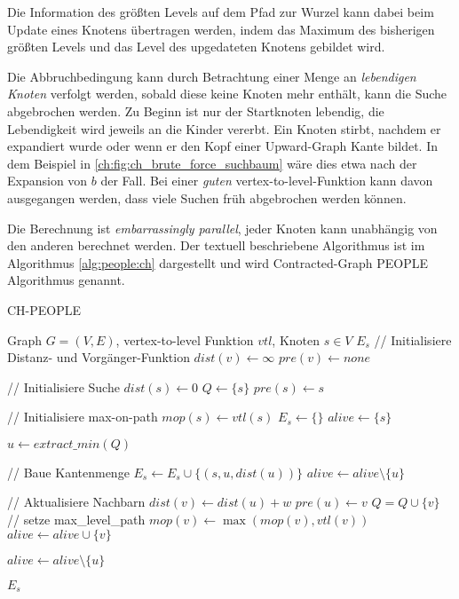 Die Information des größten Levels auf dem Pfad zur Wurzel kann dabei beim Update eines Knotens übertragen werden, indem das Maximum des bisherigen größten Levels und das Level des upgedateten Knotens gebildet wird.


Die Abbruchbedingung kann durch Betrachtung einer Menge an \emph{lebendigen Knoten} verfolgt werden, sobald diese keine Knoten mehr enthält, kann die Suche abgebrochen werden.
Zu Beginn ist nur der Startknoten lebendig, die Lebendigkeit wird jeweils an die Kinder vererbt.
Ein Knoten stirbt, nachdem er expandiert wurde oder wenn er den Kopf einer Upward-Graph Kante bildet.
In dem Beispiel in \autoref{ch:fig:ch_brute_force_suchbaum} wäre dies etwa nach der Expansion von $b$ der Fall.
Bei einer \emph{guten} vertex-to-level-Funktion kann davon ausgegangen werden, dass viele Suchen früh abgebrochen werden können.

Die Berechnung ist \emph{embarrassingly parallel}, jeder Knoten kann unabhängig von den anderen berechnet werden.
Der textuell beschriebene Algorithmus ist im Algorithmus \ref{alg:people:ch} dargestellt und wird Contracted-Graph PEOPLE Algorithmus genannt.

\begin{algorithm}[p]
  \caption{CH-PEOPLE}
  \begin{algorithmic}[1]
    \Require Graph $G = (V, E)$, vertex-to-level Funktion ${vtl}$, Knoten $s \in V$
    \Ensure $E_s$
    \State // Initialisiere Distanz- und Vorgänger-Funktion
    \State ${dist}(v) \leftarrow \infty$
    \State ${pre}(v) \leftarrow {none}$
    \EndFor

    \State
    \State // Initialisiere Suche
    \State ${dist}(s) \leftarrow 0$
    \State $Q\leftarrow \{ s \}$
    \State ${pre}(s) \leftarrow s$

    \State
    \State // Initialisiere max-on-path
    \State ${mop}(s) \leftarrow {vtl}(s)$
    \State $E_s \leftarrow \{ \}$
    \State ${alive} \leftarrow \{ s \}$

    \State
    \State $u \leftarrow{extract\_min}(Q)$\label{graphs:dijkstra:pop}

    \State
    \State // Baue Kantenmenge
    \State $E_s \leftarrow E_s \cup \{ (s, u, {dist}(u)) \}$
    \State ${alive} \leftarrow {alive} \setminus \{ u \}$
    \EndIf

    \State
    \State // Aktualisiere Nachbarn
    \State ${dist}(v) \leftarrow {dist}(u) + w$
    \State ${pre}(u) \leftarrow v$
    \State $Q = Q \cup \{ v \}$
    \State
    \State // setze max\_level\_path
    \State ${mop}(v) \leftarrow \max({mop}(v), {vtl}(v))$
    \State
    \State ${alive} \leftarrow {alive} \cup \{ v \}$
    \EndIf
    \EndIf
    \EndFor

    \State ${alive} \leftarrow {alive} \setminus \{ u \}$

    \EndWhile

    \State
    \State \Return $E_s$
  \end{algorithmic}
  \label{alg:people:ch}
\end{algorithm}

